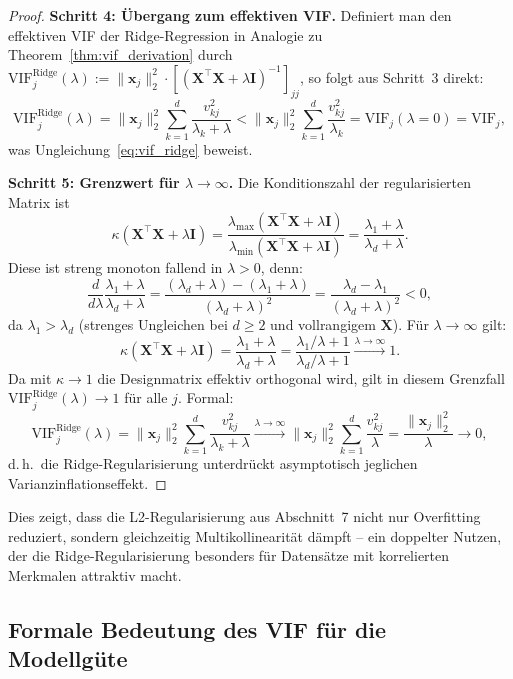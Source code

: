 ﻿\documentclass[12pt, a4paper]{article}
\theoremstyle{definition}
\theoremstyle{remark}
\newcommand{\vx}{\bm{x}}
\newcommand{\vX}{\bm{X}}
\newcommand{\T}{\top}
\begin{document}
\begin{proof}
	\textbf{Schritt 4: Übergang zum effektiven VIF.}
	Definiert man den effektiven VIF der Ridge-Regression in Analogie zu Theorem~\ref{thm:vif_derivation}
	durch $\mathrm{VIF}_j^{\mathrm{Ridge}}(\lambda) := \|\vx_j\|_2^2 \cdot [(\vX^\T\vX+\lambda\bm{I})^{-1}]_{jj}$,
	so folgt aus Schritt~3 direkt:
	\[
	\mathrm{VIF}_j^{\mathrm{Ridge}}(\lambda)
	= \|\vx_j\|_2^2 \sum_{k=1}^d \frac{v_{kj}^2}{\lambda_k+\lambda}
	< \|\vx_j\|_2^2 \sum_{k=1}^d \frac{v_{kj}^2}{\lambda_k}
	= \mathrm{VIF}_j(\lambda=0) = \mathrm{VIF}_j,
	\]
	was Ungleichung~\eqref{eq:vif_ridge} beweist.
	
	\textbf{Schritt 5: Grenzwert für $\lambda \to \infty$.}
	Die Konditionszahl der regularisierten Matrix ist
	\[
	\kappa(\vX^\T\vX + \lambda\bm{I})
	= \frac{\lambda_{\max}(\vX^\T\vX+\lambda\bm{I})}{\lambda_{\min}(\vX^\T\vX+\lambda\bm{I})}
	= \frac{\lambda_1 + \lambda}{\lambda_d + \lambda}.
	\]
	Diese ist streng monoton fallend in $\lambda > 0$, denn:
	\[
	\frac{d}{d\lambda}\frac{\lambda_1+\lambda}{\lambda_d+\lambda}
	= \frac{(\lambda_d+\lambda) - (\lambda_1+\lambda)}{(\lambda_d+\lambda)^2}
	= \frac{\lambda_d - \lambda_1}{(\lambda_d+\lambda)^2} < 0,
	\]
	da $\lambda_1 > \lambda_d$ (strenges Ungleichen bei $d \geq 2$ und vollrangigem $\vX$). Für
	$\lambda \to \infty$ gilt:
	\[
	\kappa(\vX^\T\vX + \lambda\bm{I}) = \frac{\lambda_1+\lambda}{\lambda_d+\lambda}
	= \frac{\lambda_1/\lambda + 1}{\lambda_d/\lambda + 1} \xrightarrow{\lambda\to\infty} 1.
	\]
	Da mit $\kappa \to 1$ die Designmatrix effektiv orthogonal wird, gilt in diesem Grenzfall
	$\mathrm{VIF}_j^{\mathrm{Ridge}}(\lambda) \to 1$ für alle $j$. Formal:
	\[
	\mathrm{VIF}_j^{\mathrm{Ridge}}(\lambda)
	= \|\vx_j\|_2^2 \sum_{k=1}^d \frac{v_{kj}^2}{\lambda_k+\lambda}
	\xrightarrow{\lambda\to\infty} \|\vx_j\|_2^2 \sum_{k=1}^d \frac{v_{kj}^2}{\lambda}
	= \frac{\|\vx_j\|_2^2}{\lambda} \to 0,
	\]
	d.\,h.\ die Ridge-Regularisierung unterdrückt asymptotisch jeglichen Varianzinflationseffekt.
\end{proof}

Dies zeigt, dass die L2-Regularisierung aus Abschnitt~7 nicht nur Overfitting reduziert,
sondern gleichzeitig Multikollinearität dämpft -- ein doppelter Nutzen, der die
Ridge-Regularisierung besonders für Datensätze mit korrelierten Merkmalen attraktiv macht.

\subsection{Formale Bedeutung des VIF für die Modellgüte}
\end{document}
